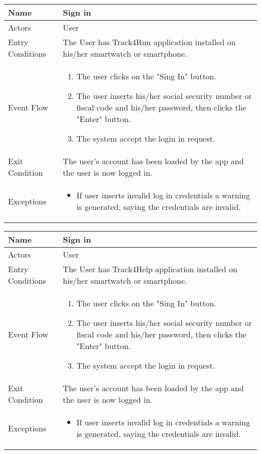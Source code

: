 \begin{table}[h]
\begin{tabular}{|l|l|}
\hline
Name             & Sign in \\ \hline
Actors           & User  \\ \hline
Entry Conditions & The User has Track4Run application installed on his/her smartwatch or smartphone.    \\ \hline
Event Flow       & \parbox{.45\textwidth}{\begin{enumerate}
            \item The user clicks on the "Sing In" button.
            \item The user inserts his/her social security number or fiscal code and his/her password, then clicks the "Enter" button.
            \item The system accept the login in request.
        \end{enumerate}}\\ \hline
Exit Condition   & The user's account has been loaded by the app and the user is now logged in.\\ \hline
Exceptions       & \parbox{.45\textwidth}  
{\begin{itemize}
\item If user inserts invalid log in credentials a warning is generated, saying the credentials are invalid.
\end{itemize}}\\ \hline
\end{tabular}
\end{table}

\begin{table}[h]
\begin{tabular}{|l|l|}
\hline
Name             & Sign in \\ \hline
Actors           & User  \\ \hline
Entry Conditions & The User has Track4Help application installed on his/her smartwatch or smartphone.    \\ \hline
Event Flow       & \parbox{.45\textwidth}{\begin{enumerate}
            \item The user clicks on the "Sing In" button.
            \item The user inserts his/her social security number or fiscal code and his/her password, then clicks the "Enter" button.
            \item The system accept the login in request.
        \end{enumerate}}\\ \hline
Exit Condition   & The user's account has been loaded by the app and the user is now logged in.\\ \hline
Exceptions       & \parbox{.45\textwidth}  
{\begin{itemize}
\item If user inserts invalid log in credentials a warning is generated, saying the credentials are invalid.
\end{itemize}}\\ \hline
\end{tabular}
\end{table}

